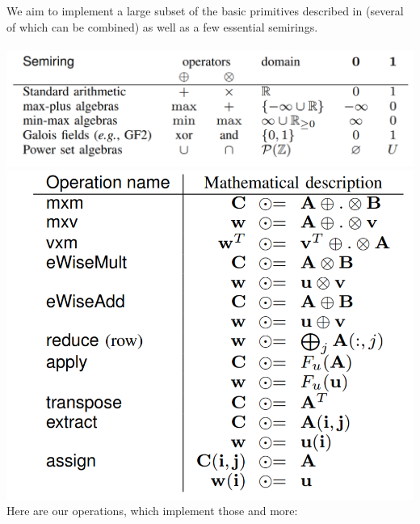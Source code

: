 We aim to implement a large subset of the basic primitives described in \cite{Gilbert} (several of which can be combined) as well as a few essential semirings.\\\\
\label{sec:semirings}
\includegraphics[scale=0.3]{figures/common Semirings.png}\\
\includegraphics[scale=0.3]{figures/BLAS primitives.png}\\
Here are our operations, which implement those and more:\\
